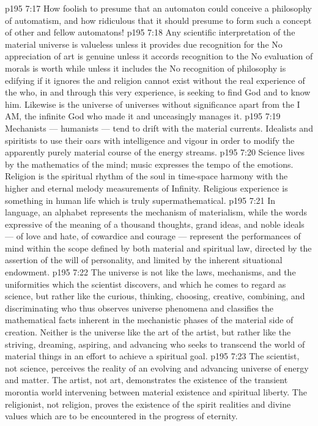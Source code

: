 \vs p195 7:17 \pc How foolish to presume that an automaton could conceive a philosophy of automatism, and how ridiculous that it should presume to form such a concept of other and fellow automatons!
\vs p195 7:18 \pc Any scientific interpretation of the material universe is valueless unless it provides due recognition for the  No appreciation of art is genuine unless it accords recognition to the  No evaluation of morals is worth while unless it includes the  No recognition of philosophy is edifying if it ignores the  and religion cannot exist without the real experience of the  who, in and through this very experience, is seeking to find God and to know him. Likewise is the universe of universes without significance apart from the I AM, the infinite God who made it and unceasingly manages it.
\vs p195 7:19 \pc Mechanists --- humanists --- tend to drift with the material currents. Idealists and spiritists  to use their oars with intelligence and vigour in order to modify the apparently purely material course of the energy streams.
\vs p195 7:20 \pc Science lives by the mathematics of the mind; music expresses the tempo of the emotions. Religion is the spiritual rhythm of the soul in time\hyp{}space harmony with the higher and eternal melody measurements of Infinity. Religious experience is something in human life which is truly supermathematical.
\vs p195 7:21 In language, an alphabet represents the mechanism of materialism, while the words expressive of the meaning of a thousand thoughts, grand ideas, and noble ideals --- of love and hate, of cowardice and courage --- represent the performances of mind within the scope defined by both material and spiritual law, directed by the assertion of the will of personality, and limited by the inherent situational endowment.
\vs p195 7:22 The universe is not like the laws, mechanisms, and the uniformities which the scientist discovers, and which he comes to regard as science, but rather like the curious, thinking, choosing, creative, combining, and discriminating  who thus observes universe phenomena and classifies the mathematical facts inherent in the mechanistic phases of the material side of creation. Neither is the universe like the art of the artist, but rather like the striving, dreaming, aspiring, and advancing  who seeks to transcend the world of material things in an effort to achieve a spiritual goal.
\vs p195 7:23 The scientist, not science, perceives the reality of an evolving and advancing universe of energy and matter. The artist, not art, demonstrates the existence of the transient morontia world intervening between material existence and spiritual liberty. The religionist, not religion, proves the existence of the spirit realities and divine values which are to be encountered in the progress of eternity.
